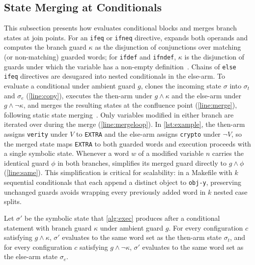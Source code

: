 \documentclass[acmsmall,screen,review,anonymous,nonacm]{acmart}
\begin{document}
  \subsection{State Merging at Conditionals}\label{sec:approach:merge}
  This subsection presents how \tool{} evaluates conditional blocks and merges branch states at join points.
  For an \texttt{ifeq} or \texttt{ifneq} directive, \tool{} expands both operands and computes the branch guard $\kappa$ as the disjunction of conjunctions over matching (or non-matching) guarded words; for \texttt{ifdef} and \texttt{ifndef}, $\kappa$ is the disjunction of guards under which the variable has a non-empty definition~\cite{gazzillo2017kmax}.
  Chains of \texttt{else ifeq} directives are desugared into nested conditionals in the else-arm.
  To evaluate a conditional under ambient guard $g$, \tool{} clones the incoming state $\sigma$ into $\sigma_t$ and $\sigma_e$ (\autoref{line:copy}), executes the then-arm under $g \land \kappa$ and the else-arm under $g \land \neg\kappa$, and merges the resulting states at the confluence point (\autoref{line:merge}), following static state merging~\cite{kuznetsov2012efficient,avgerinos2014enhancing}.
  Only variables modified in either branch are iterated over during the merge (\autoref{line:mergeloop}).
  In \autoref{lst:example}, the then-arm assigns \texttt{verity} under $V$ to \texttt{EXTRA} and the else-arm assigns \texttt{crypto} under $\neg V$, so the merged state maps \texttt{EXTRA} to both guarded words and execution proceeds with a single symbolic state.
  Whenever a word $w$ of a modified variable $n$ carries the identical guard $\phi$ in both branches, \tool{} simplifies its merged guard directly to $g \land \phi$ (\autoref{line:same}).
  This simplification is critical for scalability: in a Makefile with $k$ sequential conditionals that each append a distinct object to \texttt{obj-y}, preserving unchanged guards avoids wrapping every previously added word in $k$ nested case splits.

  \begin{proposition}\label{prop:merge}
  Let $\sigma'$ be the symbolic state that \autoref{alg:exec} produces after a conditional statement with branch guard $\kappa$ under ambient guard $g$.
  For every configuration $c$ satisfying $g \land \kappa$, $\sigma'$ evaluates to the same word set as the then-arm state $\sigma_t$, and for every configuration $c$ satisfying $g \land \neg\kappa$, $\sigma'$ evaluates to the same word set as the else-arm state $\sigma_e$.
  \end{proposition}
\end{document}

